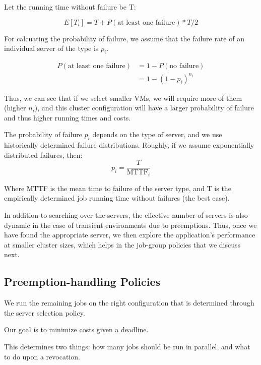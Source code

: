 Let the running time without failure be T:

\begin{equation}
  \label{eq:et1}
E[T_i] = T + P(\text{at least one failure})*T/2   
\end{equation}

For calcuating the probability of failure, we assume that the failure rate of an individual server of the type is $p_i$. 

\begin{align}
  \label{eq:pfail1}
  P(\text{at least one failure}) &= 1-P(\text{no failure}) \\
                                 &= 1-(1-p_i)^{n_i} 
\end{align}

Thus, we can see that if we select smaller VMs, we will require more of them (higher $n_i$), and this cluster configuration will have a larger probability of failure and thus higher running times and costs.

The probability of failure $p_i$ depends on the type of server, and we use historically determined failure distributions.
Roughly, if we assume exponentially distributed failures, then:
\begin{equation}
  \label{eq:pi}
  p_i = \dfrac{T}{\text{MTTF}_i}
\end{equation}

Where MTTF is the mean time to failure of the server type, and T is the empirically determined job running time without failures (the best case).






In addition to searching over the servers, the effective number of servers is also dynamic in the case of transient environments due to preemptions.
Thus, once we have found the appropriate server, we then explore the application's performance at smaller cluster sizes, which helps in the job-group policies that we discuss next. 


\subsection{Preemption-handling Policies}

We run the remaining jobs on the right configuration that is determined through the server selection policy.

Our goal is to minimize costs given a deadline.

This determines two things: how many jobs should be run in parallel, and what to do upon a revocation.

